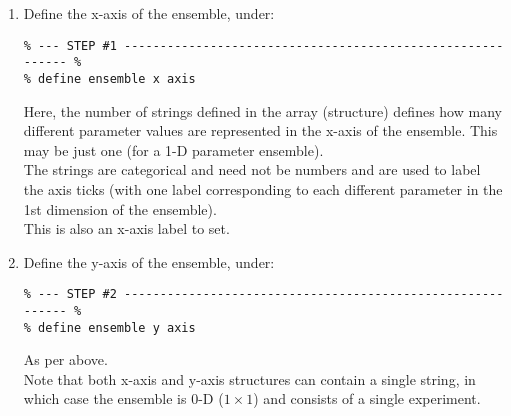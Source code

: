 \begin{enumerate}

\vspace{2mm}
\item Define the x-axis of the ensemble, under:
\vspace{-1mm}\small\begin{verbatim}
% --- STEP #1 ----------------------------------------------------------- %
% define ensemble x axis
\end{verbatim}\normalsize\vspace{-1mm}
Here, the number of strings defined in the array (structure) defines how many different parameter values are represented in the x-axis of the ensemble. This may be just one (for a 1-D parameter ensemble).
\\The strings are categorical and need not be numbers and are used to label the axis ticks (with one label corresponding to each different parameter in the 1st dimension of the ensemble).
\\This is also an x-axis label to set.

\vspace{2mm}
\item Define the y-axis of the ensemble, under:
\vspace{-1mm}\small\begin{verbatim}
% --- STEP #2 ----------------------------------------------------------- %
% define ensemble y axis
\end{verbatim}\normalsize\vspace{-1mm}
As per above.
\\Note that both x-axis and y-axis structures can contain a single string, in which case the ensemble is 0-D (\(1\times1\)) and consists of a single experiment.


\end{enumerate}
